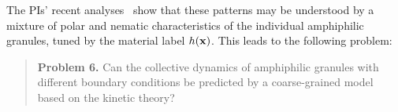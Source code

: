%
The PIs' recent analyses~\cite{fu-ryh-qua-you2022} show that these
patterns may be understood by a mixture of polar and nematic
characteristics of the individual amphiphilic granules, tuned by the
material label $h({\mathbf{x}})$. This leads to the following problem:
%
\begin{quotation}
  \noindent
  \textbf{Problem 6.} Can the collective dynamics of amphiphilic
  granules with different boundary conditions be predicted by a
  coarse-grained model based on the kinetic theory?
\end{quotation}
%
